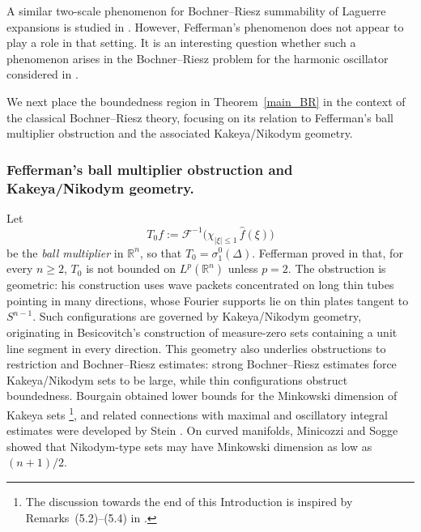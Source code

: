 \documentclass[12pt]{amsart}
\begin{document}
A similar two-scale phenomenon for Bochner--Riesz summability of Laguerre
expansions is studied in \cite{SharmaSikoraThangavelu}. However,
Fefferman's phenomenon does not appear to play a role in that setting.
It is an interesting question whether such a phenomenon arises in the
Bochner--Riesz problem for the harmonic oscillator considered in
\cite{LeeS}.
 

We next place the boundedness region in Theorem~\ref{main_BR} in the context of the classical Bochner--Riesz theory, focusing on its relation to Fefferman's ball multiplier obstruction and the associated Kakeya/Nikodym geometry.



\subsubsection*{Fefferman's ball multiplier obstruction and Kakeya/Nikodym geometry.}
Let
\[
  T_0 f := \mathcal{F}^{-1}\!\bigl(\chi_{|\xi|\le 1}\,\widehat{f}(\xi)\bigr)
\]
be the \emph{ball multiplier} in $\mathbb{R}^n$, so that $T_0 = \sigma^0_1(\Delta)$.
Fefferman proved in \cite{Fefferman} that, for every $n\geq 2$, $T_0$ is not bounded
on $L^p(\mathbb{R}^n)$ unless $p=2$. The obstruction is geometric: his construction
uses wave packets concentrated on long thin tubes pointing in many directions, whose
Fourier supports lie on thin plates tangent to $S^{n-1}$. Such configurations are
governed by Kakeya/Nikodym geometry, originating in Besicovitch's construction of
measure-zero sets containing a unit line segment in every direction. This geometry
also underlies obstructions to restriction and Bochner--Riesz estimates: strong
Bochner--Riesz estimates force Kakeya/Nikodym sets to be large, while thin
configurations obstruct boundedness. Bourgain obtained lower bounds for the
Minkowski dimension of Kakeya sets \cite{Bourgain}\footnote{The discussion towards
the end of this Introduction is inspired by Remarks~(5.2)--(5.4) in
\cite{Bourgain}.}, and related connections with maximal and oscillatory integral
estimates were developed by Stein \cite{Stein2}. On curved manifolds, Minicozzi and
Sogge \cite{MinicozziSogge} showed that Nikodym-type sets may have Minkowski dimension
as low as $(n+1)/2$.
\end{document}
